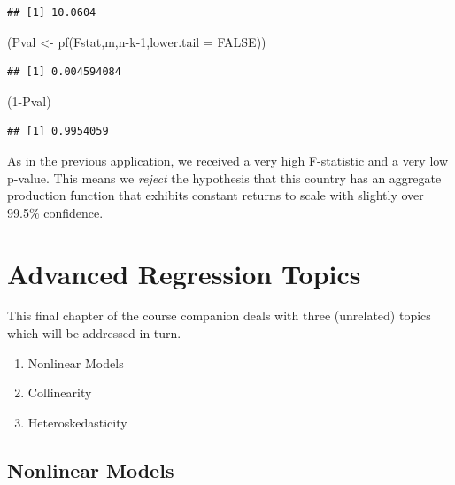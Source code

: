 \documentclass[
]{book}
\newenvironment{Shaded}{\begin{snugshade}}{\end{snugshade}}
\newcommand{\AttributeTok}[1]{\textcolor[rgb]{0.77,0.63,0.00}{#1}}
\newcommand{\ConstantTok}[1]{\textcolor[rgb]{0.00,0.00,0.00}{#1}}
\newcommand{\DecValTok}[1]{\textcolor[rgb]{0.00,0.00,0.81}{#1}}
\newcommand{\FunctionTok}[1]{\textcolor[rgb]{0.00,0.00,0.00}{#1}}
\newcommand{\NormalTok}[1]{#1}
\newcommand{\OtherTok}[1]{\textcolor[rgb]{0.56,0.35,0.01}{#1}}
\newcommand{\SpecialCharTok}[1]{\textcolor[rgb]{0.00,0.00,0.00}{#1}}
\begin{document}
\begin{verbatim}
## [1] 10.0604
\end{verbatim}

\begin{Shaded}
\begin{Highlighting}[]
\NormalTok{(Pval }\OtherTok{\textless{}{-}} \FunctionTok{pf}\NormalTok{(Fstat,m,n}\SpecialCharTok{{-}}\NormalTok{k}\DecValTok{{-}1}\NormalTok{,}\AttributeTok{lower.tail =} \ConstantTok{FALSE}\NormalTok{))}
\end{Highlighting}
\end{Shaded}

\begin{verbatim}
## [1] 0.004594084
\end{verbatim}

\begin{Shaded}
\begin{Highlighting}[]
\NormalTok{(}\DecValTok{1}\SpecialCharTok{{-}}\NormalTok{Pval)}
\end{Highlighting}
\end{Shaded}

\begin{verbatim}
## [1] 0.9954059
\end{verbatim}

As in the previous application, we received a very high F-statistic and a very low p-value. This means we \emph{reject} the hypothesis that this country has an aggregate production function that exhibits constant returns to scale with slightly over 99.5\% confidence.

\hypertarget{Advanced}{%
\chapter{Advanced Regression Topics}\label{Advanced}}

This final chapter of the course companion deals with three (unrelated) topics which will be addressed in turn.

\begin{enumerate}
\def\labelenumi{\arabic{enumi}.}
\item
  Nonlinear Models
\item
  Collinearity
\item
  Heteroskedasticity
\end{enumerate}

\hypertarget{nonlinear-models}{%
\section{Nonlinear Models}\label{nonlinear-models}}
\end{document}
